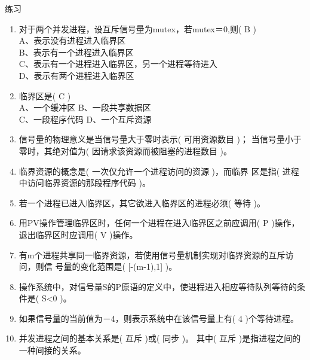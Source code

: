 \begin{frame}{练习}
\begin{enumerate}
  \item 对于两个并发进程，设互斥信号量为mutex，若mutex＝0,则({\color{white} B} ) \\
    A、表示没有进程进入临界区 \\
    B、表示有一个进程进入临界区 \\
    C、表示有一个进程进入临界区，另一个进程等待进入 \\
    D、表示有两个进程进入临界区 \\

  \item 临界区是({\color{white} C} ) \\
    A、一个缓冲区  \hspace{1cm} B、一段共享数据区  \\
    C、一段程序代码 \hspace{1cm}  D、一个互斥资源

  \item 信号量的物理意义是当信号量大于零时表示({\color{white} 可用资源数目} )；
    当信号量小于零时，其绝对值为({\color{white} 因请求该资源而被阻塞的进程数目} )。

  \item 临界资源的概念是({\color{white} 一次仅允许一个进程访问的资源} )，而临界
    区是指({\color{white} 进程中访问临界资源的那段程序代码} )。

  \item 若一个进程已进入临界区，其它欲进入临界区的进程必须({\color{white} 等待} )。

  \item 用PV操作管理临界区时，任何一个进程在进入临界区之前应调用({\color{white}
      P} )操作，退出临界区时应调用({\color{white} V} )操作。

  \item 有m个进程共享同一临界资源，若使用信号量机制实现对临界资源的互斥访问，则信
    号量的变化范围是({\color{white} [-(m-1),1]} )。

  \item 操作系统中，对信号量S的P原语的定义中，使进程进入相应等待队列等待的条件是({\color{white} S<0} )。

  \item 如果信号量的当前值为－4，则表示系统中在该信号量上有({\color{white} 4} )个等待进程。

  \item 并发进程之间的基本关系是({\color{white} 互斥} )或({\color{white} 同步} )。
    其中({\color{white} 互斥} )是指进程之间的一种间接的关系。

  \end{enumerate}
\end{frame}



